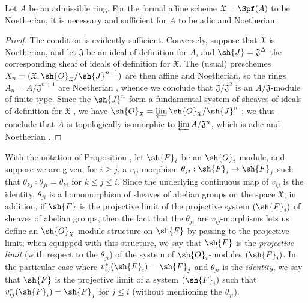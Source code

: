 \begin{corollary}[10.6.5]
\label{I.10.6.5}
Let $A$ be an admissible ring.
For the formal affine scheme $\mathfrak{X}=\Spf(A)$ to be Noetherian, it is necessary and sufficient for $A$ to be adic and Noetherian.
\end{corollary}

\begin{proof}
The condition is evidently sufficient.
Conversely, suppose that $\mathfrak{X}$ is Noetherian, and let $\mathfrak{J}$ be an ideal of definition for $A$, and $\sh{J}=\mathfrak{J}^\Delta$ the corresponding sheaf of ideals of definition for $\mathfrak{X}$.
The (usual) preschemes $X_n=(\mathfrak{X},\sh{O}_\mathfrak{X}/\sh{J}^{n+1})$ are then affine and Noetherian, so the rings $A_n=A/\mathfrak{J}^{n+1}$ are Noetherian , whence we conclude that $\mathfrak{J}/\mathfrak{J}^2$ is an $A/\mathfrak{J}$-module of finite type.
Since the $\sh{J}^n$ form a fundamental system of sheaves of ideals of definition for $\mathfrak{X}$ , we have $\sh{O}_\mathfrak{X}=\varprojlim\sh{O}_\mathfrak{X}/\sh{J}^n$ ; we thus conclude  that $A$ is topologically isomorphic to $\varprojlim A/\mathfrak{J}^n$, which is adic and Noetherian .
\end{proof}

\begin{remark}[10.6.6]
\label{I.10.6.6}
With the notation of Proposition , let $\sh{F}_i$ be an $\sh{O}_i$-module, and suppose we are given, for $i\geq j$, a $v_{ij}$-morphism $\theta_{ji}:\sh{F}_i\to\sh{F}_j$ such that $\theta_{kj}\circ\theta_{ji}=\theta_{ki}$ for $k\leq j\leq i$.
Since the underlying continuous map of $v_{ij}$ is the identity, $\theta_{ji}$ is a homomorphism of sheaves of abelian groups on the space $\mathfrak{X}$; in addition, if $\sh{F}$ is the projective limit of the projective system $(\sh{F}_i)$ of sheaves of abelian groups, then the fact that the $\theta_{ji}$ are $v_{ij}$-morphisms lets us define an $\sh{O}_\mathfrak{X}$-module structure on $\sh{F}$ by passing to the projective limit; when equipped with this structure, we say that $\sh{F}$ is the \emph{projective limit} (with respect to the $\theta_{ji}$) of the system of $\sh{O}_i$-modules $(\sh{F}_i)$.
In the particular case where $v_{ij}^*(\sh{F}_i)=\sh{F}_j$ and $\theta_{ji}$ is the \emph{identity}, we say that $\sh{F}$ is the projective limit of a system $(\sh{F}_i)$ such that $v_{ij}^*(\sh{F}_i)=\sh{F}_j$ for $j\leq i$ (without mentioning the $\theta_{ji}$).
\end{remark}

